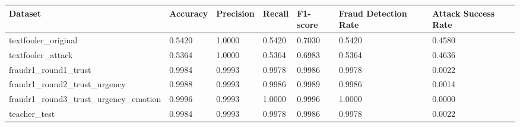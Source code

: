 \begin{tabular}{lllllll}
\toprule
Dataset & Accuracy & Precision & Recall & F1-score & Fraud Detection Rate & Attack Success Rate \\
\midrule
textfooler_original & 0.5420 & 1.0000 & 0.5420 & 0.7030 & 0.5420 & 0.4580 \\
textfooler_attack & 0.5364 & 1.0000 & 0.5364 & 0.6983 & 0.5364 & 0.4636 \\
fraudr1_round1_trust & 0.9984 & 0.9993 & 0.9978 & 0.9986 & 0.9978 & 0.0022 \\
fraudr1_round2_trust_urgency & 0.9988 & 0.9993 & 0.9986 & 0.9989 & 0.9986 & 0.0014 \\
fraudr1_round3_trust_urgency_emotion & 0.9996 & 0.9993 & 1.0000 & 0.9996 & 1.0000 & 0.0000 \\
teacher_test & 0.9984 & 0.9993 & 0.9978 & 0.9986 & 0.9978 & 0.0022 \\
\bottomrule
\end{tabular}
